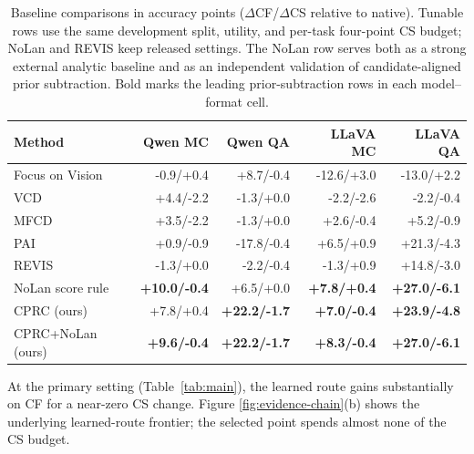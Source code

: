 \documentclass[letterpaper]{article}
\begin{document}
\begin{table}[!tb]
\centering
\footnotesize
\setlength{\tabcolsep}{1.4pt}
{\scriptsize
\begin{tabular*}{\columnwidth}{@{\extracolsep{\fill}}lrrrr@{}}
\toprule
Method & Qwen MC & Qwen QA & LLaVA MC & LLaVA QA \\
\midrule
Focus on Vision & -0.9/+0.4 & +8.7/-0.4 & -12.6/+3.0 & -13.0/+2.2 \\
VCD & +4.4/-2.2 & -1.3/+0.0 & -2.2/-2.6 & -2.2/-0.4 \\
MFCD & +3.5/-2.2 & -1.3/+0.0 & +2.6/-0.4 & +5.2/-0.9 \\
PAI & +0.9/-0.9 & -17.8/-0.4 & +6.5/+0.9 & +21.3/-4.3 \\
REVIS & -1.3/+0.0 & -2.2/-0.4 & -1.3/+0.9 & +14.8/-3.0 \\
NoLan score rule & \textbf{+10.0/-0.4} & +6.5/+0.0 & \textbf{+7.8/+0.4} & \textbf{+27.0/-6.1} \\
\midrule
CPRC (ours) & +7.8/+0.4 & \textbf{+22.2/-1.7} & \textbf{+7.0/-0.4} & \textbf{+23.9/-4.8} \\
CPRC+NoLan (ours) & \textbf{+9.6/-0.4} & \textbf{+22.2/-1.7} & \textbf{+8.3/-0.4} & \textbf{+27.0/-6.1} \\
\bottomrule
\end{tabular*}}
\caption{Baseline comparisons in accuracy points ($\Delta$CF/$\Delta$CS
relative to native). Tunable rows use the same development split, utility, and
per-task four-point CS budget; NoLan and REVIS keep released settings. The
NoLan row serves both as a strong external analytic baseline and as an
independent validation of candidate-aligned prior subtraction. Bold marks the
leading prior-subtraction rows in each model--format cell.}
\label{tab:controlled}
\end{table}


At the primary setting (Table~\ref{tab:main}), the learned route gains
substantially on CF for a near-zero CS change. Figure
\ref{fig:evidence-chain}(b) shows the underlying learned-route frontier; the
selected point spends almost none of the CS budget.
\end{document}
